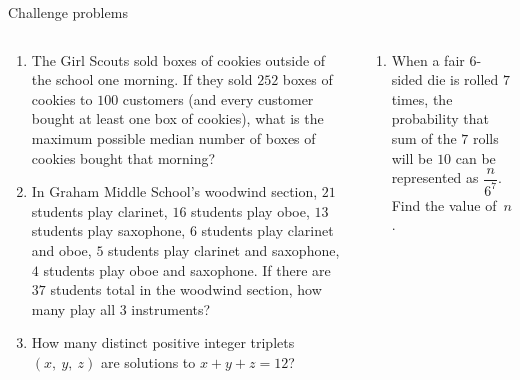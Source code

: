 \documentclass[9pt,aspectratio=169]{beamer}
\begin{document}
\begin{frame}{Challenge problems}
  \begin{columns}[T]
    \begin{column}{0.5\textwidth}
      \begin{enumerate}
        \item The Girl Scouts sold boxes of cookies outside of the school one morning.  If they sold $252$ boxes of cookies to $100$ customers (and every customer bought at least one box of cookies), what is the maximum possible median number of boxes of cookies bought that morning?
        \item In Graham Middle School's woodwind section, $21$ students play clarinet, $16$ students play oboe, $13$ students play saxophone, $6$ students play clarinet and oboe, $5$ students play clarinet and saxophone, $4$ students play oboe and saxophone.  If there are $37$ students total in the woodwind section, how many play all $3$ instruments?
        \item How many distinct positive integer triplets $(x,\ y,\ z)$ are solutions to $x + y + z = 12$?
        \seti
      \end{enumerate}
    \end{column}
    \begin{column}{0.5\textwidth}
      \begin{enumerate}
        \conti
        \item When a fair $6$-sided die is rolled $7$ times, the probability that sum of the $7$ rolls will be $10$ can be represented as $\dfrac{n}{6^7}$.  Find the value of~$n$.
      \end{enumerate}
    \end{column}
  \end{columns}
\end{frame}

\end{document}
